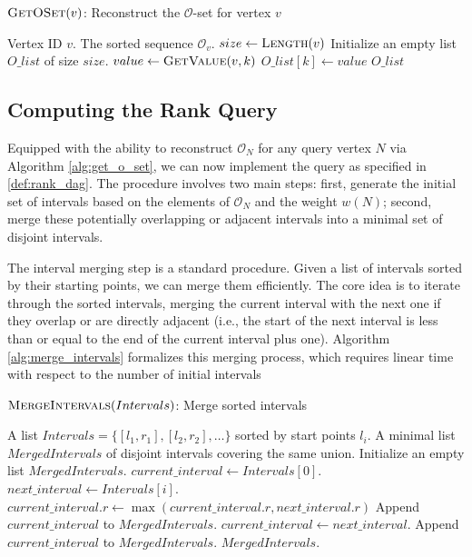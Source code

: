 \begin{algorithm}
    \caption{$\textsc{GetOSet}(v)$: Reconstruct the $\mathcal{O}$-set for vertex $v$}
    \label{alg:get_o_set}
    \small
    \begin{algorithmic}[1]
        \Require Vertex ID $v$.
        \Ensure The sorted sequence $\mathcal{O}_v$.
        \State $size \gets \textsc{Length}(v)$
        \State Initialize an empty list $O\_list$ of size $size$.
        \State $value \gets \textsc{GetValue}(v, k)$
        \State $O\_list[k] \gets value$
        \EndFor
        \State \Return $O\_list$
    \end{algorithmic}
\end{algorithm}

\subsection{Computing the Rank Query}
\label{subsec:computing_rank}

Equipped with the ability to reconstruct $\mathcal{O}_N$ for any query vertex $N$ via Algorithm \ref{alg:get_o_set}, we can now implement the \Rank{} query as specified in \ref{def:rank_dag}. The procedure involves two main steps: first, generate the initial set of intervals based on the elements of $\mathcal{O}_N$ and the weight $w(N)$; second, merge these potentially overlapping or adjacent intervals into a minimal set of disjoint intervals.

The interval merging step is a standard procedure. Given a list of intervals sorted by their starting points, we can merge them efficiently. The core idea is to iterate through the sorted intervals, merging the current interval with the next one if they overlap or are directly adjacent (i.e., the start of the next interval is less than or equal to the end of the current interval plus one). Algorithm \ref{alg:merge_intervals} formalizes this merging process, which requires linear time with respect to the number of initial intervals
\begin{algorithm}[htbp]
    \caption{$\textsc{MergeIntervals}(Intervals)$: Merge sorted intervals}
    \label{alg:merge_intervals}
    \small
    \begin{algorithmic}[1]
        \Require A list $Intervals = \{[l_1, r_1], [l_2, r_2], \dots\}$ sorted by start points $l_i$.
        \Ensure A minimal list $MergedIntervals$ of disjoint intervals covering the same union.
        \State Initialize an empty list $MergedIntervals$.
        \State $current\_interval \gets Intervals[0]$.
        \State $next\_interval \gets Intervals[i]$.
        \State $current\_interval.r \gets \max(current\_interval.r, next\_interval.r)$
        \Else
        \State Append $current\_interval$ to $MergedIntervals$.
        \State $current\_interval \gets next\_interval$.
        \EndIf
        \EndFor
        \State Append $current\_interval$ to $MergedIntervals$.
        \EndIf
        \State \Return $MergedIntervals$.
    \end{algorithmic}
\end{algorithm}


